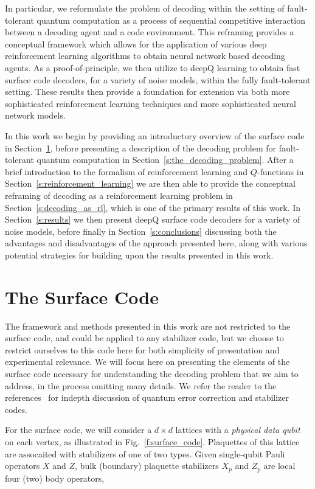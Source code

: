 \documentclass[onecolumn,preprintnumbers,amsmath,amssymb,notitlepage,nofootinbib,longbibliography,superscriptaddress,aps,pra,10pt]{revtex4-1}
\begin{document}
	In particular, we reformulate the problem of decoding within the setting of fault-tolerant quantum computation as a process of sequential competitive interaction between a decoding agent and a code environment.
	This reframing provides a conceptual framework which allows for the application of various deep reinforcement learning algorithms to obtain neural network based decoding agents.
	As a proof-of-principle, we then utilize to deepQ learning to obtain fast surface code decoders, for a variety of noise models, within the fully fault-tolerant setting.
	These results then provide a foundation for extension via both more sophisticated reinforcement learning techniques and more sophisticated neural network models.

	In this work we begin by providing an introductory overview of the surface code in Section~\ref{s:the_surface_code}, before presenting a description of the decoding problem for fault-tolerant quantum computation in Section~\ref{s:the_decoding_problem}.
	After a brief introduction to the formalism of reinforcement learning and $Q$-functions in Section~\ref{s:reinforcement_learning} we are then able to provide the conceptual reframing of decoding as a reinforcement learning problem in Section~\ref{s:decoding_as_rl}, which is one of the primary results of this work.
	In Section~\ref{s:results} we then present deepQ surface code decoders for a variety of noise models, before finally in Section~\ref{s:conclusions} discussing both the advantages and disadvantages of the approach presented here, along with various potential strategies for building upon the results presented in this work.

\section{The Surface Code}\label{s:the_surface_code}

	The framework and methods presented in this work are not restricted to the surface code, and could be applied to any stabilizer code, but we choose to restrict ourselves to this code here for both simplicity of presentation and experimental relevance.
	We will focus here on presenting the elements of the surface code necessary for understanding the decoding problem that we aim to address, in the process omitting many details.
	We refer the reader to the references~\cite{Preskill17lectures, Gottesman97} for indepth discussion of quantum error correction and stabilizer codes.

	For the surface code, we will consider a $d\times d$ lattices with a \textit{physical data qubit} on each vertex, as illustrated in Fig.~\ref{f:surface_code}.
	Plaquettes of this lattice are assocaited with stabilizers of one of two types.
	Given single-qubit Pauli operators $X$ and $Z$, bulk (boundary) plaquette stabilizers $X_{p}$ and $Z_{p}$ are local four (two) body operators,
\end{document}
